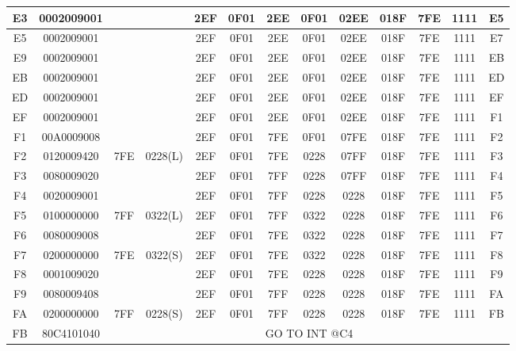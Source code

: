 {\begin{flushleft}
\begin{tabular}{|c|c|c|c|c|c|c|c|c|c|c|c|c|}
        \hline
        E3       & 0002009001 &       &          & 2EF & 0F01 & 2EE & 0F01 & 02EE & 018F & 7FE & 1111 & E5 \\
        \hline
        E5       & 0002009001 &       &          & 2EF & 0F01 & 2EE & 0F01 & 02EE & 018F & 7FE & 1111 & E7 \\
        \hline
        E9       & 0002009001 &       &          & 2EF & 0F01 & 2EE & 0F01 & 02EE & 018F & 7FE & 1111 & EB \\
        \hline
        EB       & 0002009001 &       &          & 2EF & 0F01 & 2EE & 0F01 & 02EE & 018F & 7FE & 1111 & ED \\
        \hline
        ED       & 0002009001 &       &          & 2EF & 0F01 & 2EE & 0F01 & 02EE & 018F & 7FE & 1111 & EF \\
        \hline
        EF       & 0002009001 &       &          & 2EF & 0F01 & 2EE & 0F01 & 02EE & 018F & 7FE & 1111 & F1 \\
        \hline
        F1       & 00A0009008 &       &          & 2EF & 0F01 & 7FE & 0F01 & 07FE & 018F & 7FE & 1111 & F2 \\
        \hline
        F2       & 0120009420 & 7FE   & 0228(L)  & 2EF & 0F01 & 7FE & 0228 & 07FF & 018F & 7FE & 1111 & F3 \\
        \hline
        F3       & 0080009020 &       &          & 2EF & 0F01 & 7FF & 0228 & 07FF & 018F & 7FE & 1111 & F4 \\
        \hline
        F4       & 0020009001 &       &          & 2EF & 0F01 & 7FF & 0228 & 0228 & 018F & 7FE & 1111 & F5 \\
        \hline
        F5       & 0100000000 & 7FF   & 0322(L)  & 2EF & 0F01 & 7FF & 0322 & 0228 & 018F & 7FE & 1111 & F6 \\
        \hline
        F6       & 0080009008 &       &          & 2EF & 0F01 & 7FE & 0322 & 0228 & 018F & 7FE & 1111 & F7 \\
        \hline
        F7       & 0200000000 & 7FE   & 0322(S)  & 2EF & 0F01 & 7FE & 0322 & 0228 & 018F & 7FE & 1111 & F8 \\
        \hline
        F8       & 0001009020 &       &          & 2EF & 0F01 & 7FE & 0228 & 0228 & 018F & 7FE & 1111 & F9 \\
        \hline
        F9       & 0080009408 &       &          & 2EF & 0F01 & 7FF & 0228 & 0228 & 018F & 7FE & 1111 & FA \\
        \hline
        FA       & 0200000000 & 7FF   & 0228(S)  & 2EF & 0F01 & 7FF & 0228 & 0228 & 018F & 7FE & 1111 & FB \\
        \hline
        FB       & 80C4101040 &    \multicolumn{11}{1}{GO TO INT @C4} \\
        \hline

    \end{tabular}
\end{flushleft}
}
